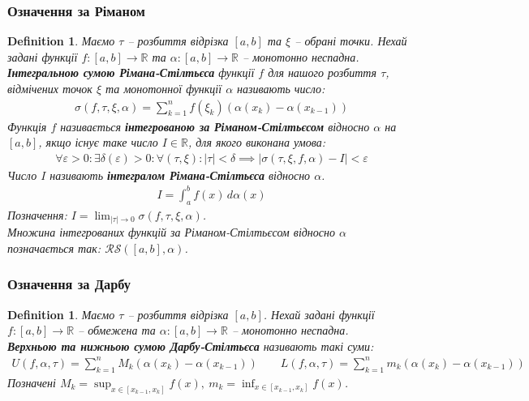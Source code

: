 \documentclass[a4paper, 10pt]{article}
\theoremstyle{theoremdd}
\theoremstyle{theoremdd}
\theoremstyle{theoremdd}
\newtheorem{definition}[theorem]{Definition}
\theoremstyle{theoremdd}
\theoremstyle{theoremdd}
\theoremstyle{theoremdd}
\theoremstyle{theoremdd}
\theoremstyle{theoremdd}
\theoremstyle{theoremdd}
\begin{document}
\subsubsection{Означення за Ріманом}
\begin{definition}
Маємо $\tau$ -- розбиття відрізка $[a,b]$ та $\xi$ -- обрані точки. Нехай задані функції $f \colon [a,b] \to \mathbb{R}$ та $\alpha \colon [a,b] \to \mathbb{R}$ -- монотонно неспадна.\\
\textbf{Інтегральною сумою Рімана-Стілтьєса} функції $f$ для нашого розбиття $\tau$, відмічених точок $\xi$ та монотонної функції $\alpha$ називають число:
\begin{align*}
\sigma(f,\tau,\xi,\alpha) = \sum_{k=1}^n f(\xi_k) (\alpha(x_k) - \alpha(x_{k-1}))
\end{align*}
Функція $f$ називається \textbf{інтегрованою за Ріманом-Стілтьєсом} відносно $\alpha$ на $[a,b]$, якщо існує таке число $I \in \mathbb{R}$, для якого виконана умова:
\begin{align*}
\forall \varepsilon > 0: \exists \delta(\varepsilon) > 0: \forall (\tau,\xi): |\tau| < \delta \implies |\sigma(\tau,\xi,f,\alpha) - I| < \varepsilon
\end{align*}
Число $I$ називають \textbf{інтегралом Рімана-Стілтьєса} відносно $\alpha$.
\begin{align*}
I = \int_a^b f(x)\,d\alpha(x)
\end{align*}
Позначення: $I = \displaystyle\lim_{|\tau| \to 0} \sigma(f,\tau,\xi,\alpha)$.\\
Множина інтегрованих функцій за Ріманом-Стілтьєсом відносно $\alpha$ позначається так: $\mathcal{RS}([a,b],\alpha)$.
\end{definition}

\subsubsection{Означення за Дарбу}
\begin{definition}
Маємо $\tau$ -- розбиття відрізка $[a,b]$. Нехай задані функції $f \colon [a,b] \to \mathbb{R}$ -- обмежена та $\alpha \colon [a,b] \to \mathbb{R}$ -- монотонно неспадна.\\
\textbf{Верхньою та нижньою сумою Дарбу-Стілтьєса} називають такі суми:
\begin{align*}
U(f,\alpha,\tau) = \sum_{k=1}^n M_k (\alpha(x_k) - \alpha(x_{k-1})) \qquad L(f,\alpha,\tau) = \sum_{k=1}^n m_k (\alpha(x_k) - \alpha(x_{k-1})) 
\end{align*}
Позначені $M_k = \displaystyle\sup_{x \in [x_{k-1},x_k]} f(x),\ m_k = \inf_{x \in [x_{k-1},x_k]} f(x)$.
\end{definition}
\end{document}
